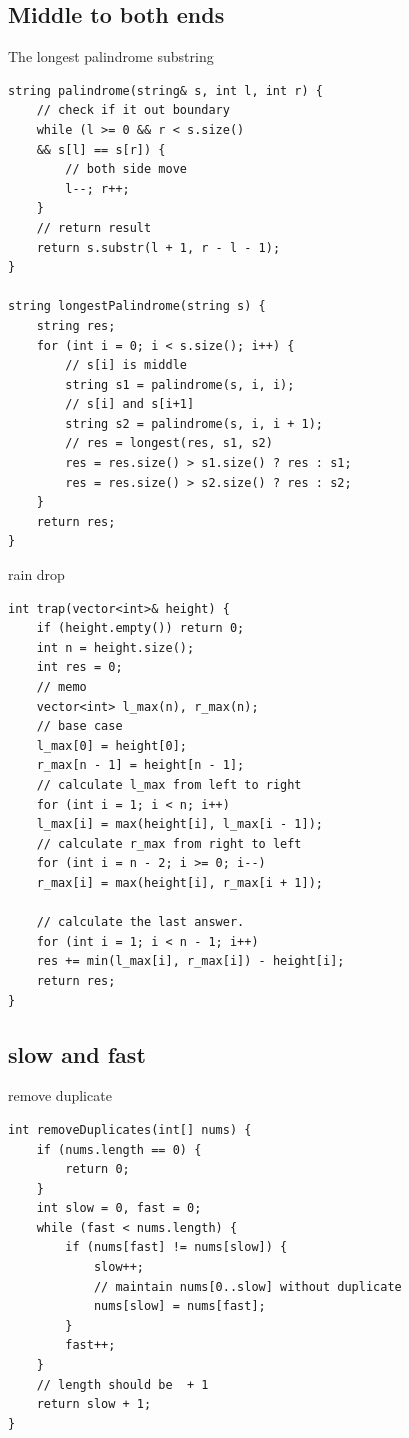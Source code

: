 \documentclass[a4paper,11pt,twoside]{book}
\begin{document}
\subsection{Middle to both ends}

	\par The longest palindrome substring
	
\begin{lstlisting}[breaklines]
string palindrome(string& s, int l, int r) {
	// check if it out boundary
	while (l >= 0 && r < s.size()
	&& s[l] == s[r]) {
		// both side move
		l--; r++;
	}
	// return result
	return s.substr(l + 1, r - l - 1);
}

string longestPalindrome(string s) {
	string res;
	for (int i = 0; i < s.size(); i++) {
		// s[i] is middle
		string s1 = palindrome(s, i, i);
		// s[i] and s[i+1] 
		string s2 = palindrome(s, i, i + 1);
		// res = longest(res, s1, s2)
		res = res.size() > s1.size() ? res : s1;
		res = res.size() > s2.size() ? res : s2;
	}
	return res;
}
\end{lstlisting}
	
	\par rain drop
	
\begin{lstlisting}[breaklines]
int trap(vector<int>& height) {
	if (height.empty()) return 0;
	int n = height.size();
	int res = 0;
	// memo
	vector<int> l_max(n), r_max(n);
	// base case
	l_max[0] = height[0];
	r_max[n - 1] = height[n - 1];
	// calculate l_max from left to right
	for (int i = 1; i < n; i++)
	l_max[i] = max(height[i], l_max[i - 1]);
	// calculate r_max from right to left
	for (int i = n - 2; i >= 0; i--) 
	r_max[i] = max(height[i], r_max[i + 1]);
	
	// calculate the last answer.
	for (int i = 1; i < n - 1; i++) 
	res += min(l_max[i], r_max[i]) - height[i];
	return res;
}
\end{lstlisting}



\subsection{slow and fast}

	\par remove duplicate
\begin{lstlisting}[breaklines]
int removeDuplicates(int[] nums) {
	if (nums.length == 0) {
		return 0;
	}
	int slow = 0, fast = 0;
	while (fast < nums.length) {
		if (nums[fast] != nums[slow]) {
			slow++;
			// maintain nums[0..slow] without duplicate
			nums[slow] = nums[fast];
		}
		fast++;
	}
	// length should be  + 1
	return slow + 1;
}
\end{lstlisting}
\end{document}
